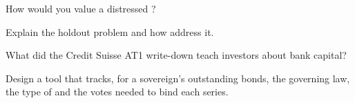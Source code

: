 \begin{interviewq}\label{iq:m2:distressed-sovereign-and-bank-capital-credit:3}
How would you value a distressed ?
\end{interviewq}

\begin{interviewq}\label{iq:m2:distressed-sovereign-and-bank-capital-credit:4}
Explain the holdout problem and how  address it.
\end{interviewq}

\begin{interviewq}\label{iq:m2:distressed-sovereign-and-bank-capital-credit:5}
What did the Credit Suisse AT1 write-down teach investors about bank capital?
\end{interviewq}

\begin{interviewq}\label{iq:m2:distressed-sovereign-and-bank-capital-credit:6}
Design a tool that tracks, for a sovereign's outstanding bonds, the governing law, the
type of  and the votes needed to bind each series.
\end{interviewq}
